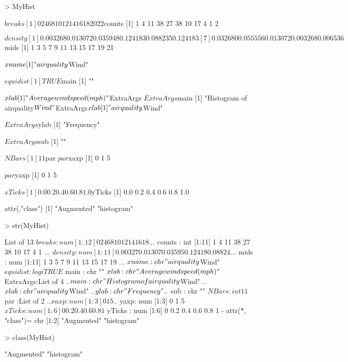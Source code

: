 \begin{Schunk}
\begin{Sinput}
> MyHist 
\end{Sinput}
\begin{Soutput}
$breaks
 [1]  0  2  4  6  8 10 12 14 16 18 20 22

$counts
 [1]  1  4 11 38 27 38 10 17  4  1  2

$density
 [1] 0.003268 0.013072 0.035948 0.124183 0.088235 0.124183
 [7] 0.032680 0.055556 0.013072 0.003268 0.006536

$mids
 [1]  1  3  5  7  9 11 13 15 17 19 21

$xname
[1] "airquality$Wind"

$equidist
[1] TRUE

$main
[1] ""

$xlab
[1] "Average wind speed (mph)"

$ExtraArgs
$ExtraArgs$main
[1] "Histogram of airquality$Wind"

$ExtraArgs$xlab
[1] "airquality$Wind"

$ExtraArgs$ylab
[1] "Frequency"

$ExtraArgs$sub
[1] ""


$NBars
[1] 11

$par
$par$xaxp
[1] 0 1 5

$par$yaxp
[1] 0 1 5


$xTicks
[1] 0.0 0.2 0.4 0.6 0.8 1.0

$yTicks
[1] 0.0 0.2 0.4 0.6 0.8 1.0

attr(,"class")
[1] "Augmented" "histogram"
\end{Soutput}
\begin{Sinput}
> str(MyHist) 
\end{Sinput}
\begin{Soutput}
List of 13
 $ breaks   : num [1:12] 0 2 4 6 8 10 12 14 16 18 ...
 $ counts   : int [1:11] 1 4 11 38 27 38 10 17 4 1 ...
 $ density  : num [1:11] 0.00327 0.01307 0.03595 0.12418 0.08824 ...
 $ mids     : num [1:11] 1 3 5 7 9 11 13 15 17 19 ...
 $ xname    : chr "airquality$Wind"
 $ equidist : logi TRUE
 $ main     : chr ""
 $ xlab     : chr "Average wind speed (mph)"
 $ ExtraArgs:List of 4
  ..$ main: chr "Histogram of airquality$Wind"
  ..$ xlab: chr "airquality$Wind"
  ..$ ylab: chr "Frequency"
  ..$ sub : chr ""
 $ NBars    : int 11
 $ par      :List of 2
  ..$ xaxp: num [1:3] 0 1 5
  ..$ yaxp: num [1:3] 0 1 5
 $ xTicks   : num [1:6] 0 0.2 0.4 0.6 0.8 1
 $ yTicks   : num [1:6] 0 0.2 0.4 0.6 0.8 1
 - attr(*, "class")= chr [1:2] "Augmented" "histogram"
\end{Soutput}
\begin{Sinput}
> class(MyHist) 
\end{Sinput}
\begin{Soutput}
[1] "Augmented" "histogram"
\end{Soutput}
\end{Schunk}

